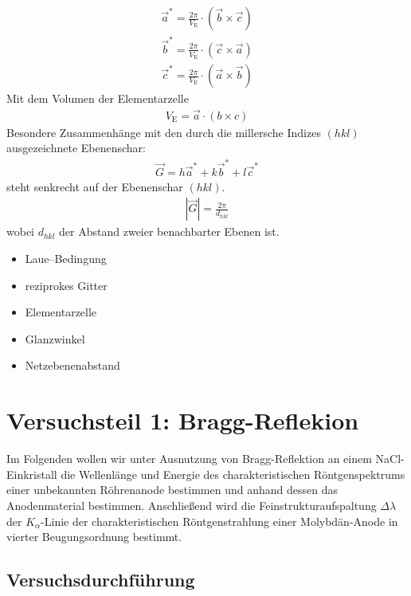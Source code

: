 \documentclass[10pt, a4paper]{article}
\begin{document}
\begin{align}
  \vec{a}^{*} = \frac{2\pi}{V_\mathrm{E}} \cdot ( \vec{b} \times \vec{c} ) \nonumber\\
  \vec{b}^{*} = \frac{2\pi}{V_\mathrm{E}} \cdot ( \vec{c} \times \vec{a} ) \nonumber\\
  \vec{c}^{*} = \frac{2\pi}{V_\mathrm{E}} \cdot ( \vec{a} \times \vec{b} )
\end{align}
Mit dem Volumen der Elementarzelle
\begin{align}
  V_\mathrm{E} = \vec{a} \cdot \left( b \times c \right)
\end{align}
Besondere Zusammenhänge mit den durch die millersche Indizes $(hkl)$ ausgezeichnete Ebenenschar:
\begin{align}
  \vec{G} = h \vec{a}^{*} + k \vec{b}^{*} + l \vec{c}^{*}
\end{align}
steht senkrecht auf der Ebenenschar $(hkl)$.
\begin{align}
  | \vec{G} | = \frac{2\pi}{d_{hkl}}
\end{align}
wobei $d_{hkl}$ der Abstand zweier benachbarter Ebenen ist.



\begin{itemize}
  \item Laue--Bedingung
  \item reziprokes Gitter
  \item Elementarzelle
  \item Glanzwinkel
  \item Netzebenenabstand
\end{itemize}

\section{Versuchsteil 1: Bragg-Reflekion}
Im Folgenden wollen wir unter Ausnutzung von Bragg-Reflektion an einem NaCl-Einkristall die Wellenlänge und Energie des charakteristischen Röntgenspektrums einer unbekannten Röhrenanode bestimmen und anhand dessen das Anodenmaterial bestimmen.
Anschließend wird die Feinstrukturaufspaltung $\Delta \lambda$ der $K_\alpha$-Linie der charakteristischen Röntgenstrahlung einer Molybdän-Anode in vierter Beugungsordnung bestimmt.

\subsection{Versuchsdurchführung}
\end{document}
